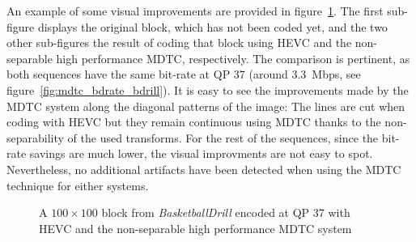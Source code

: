 \documentclass[11pt,a4paper,openright,twoside]{book}
\numberwithin{equation}{section} %
\numberwithin{figure}{section} %
\numberwithin{table}{section} %
\begin{document}
An example of some visual improvements are provided in
figure~\ref{fig:mdtc_bdrill_visual}.
The first sub-figure displays the original block, which has not been coded
yet, and the two other sub-figures the result of coding that block using
\ac{HEVC} and the non-separable high performance \ac{MDTC}, respectively.
The comparison is pertinent, as both sequences have the same bit-rate at
\ac{QP} 37 (around \SI{3.3}{\mega bps}, see
figure~\ref{fig:mdtc_bdrate_bdrill}).
It is easy to see the improvements made by the \ac{MDTC} system along the
diagonal patterns of the image:
The lines are cut when coding with \ac{HEVC} but they remain continuous using
\ac{MDTC} thanks to the non-separability of the used transforms.
For the rest of the sequences, since the bit-rate savings are much lower, the
visual improvments are not easy to spot.
Nevertheless, no additional artifacts have been detected when using the
\ac{MDTC} technique for either systems.

\begin{figure}[tb]
	\centering
	\hfill
	\hfill
	\caption[Example of a $100\times100$ block from \emph{BasketballDrill}
	coded at \acs{QP} 37]
	{A $100\times100$ block from \emph{BasketballDrill} encoded at \acs{QP} 37
	with \acs{HEVC} and the non-separable high performance \acs{MDTC} system}
	\label{fig:mdtc_bdrill_visual}
\end{figure}
\end{document}
